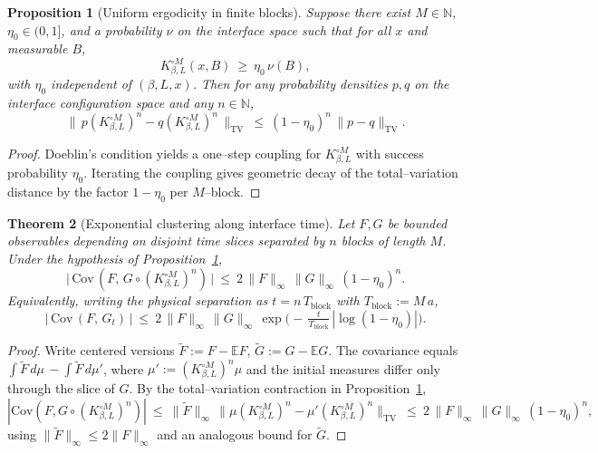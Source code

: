 \documentclass[11pt]{amsart}
\theoremstyle{plain}
\newtheorem{theorem}{Theorem}[section]
\newtheorem{proposition}[theorem]{Proposition}
\theoremstyle{definition}
\theoremstyle{remark}
\begin{document}
\begin{proposition}[Uniform ergodicity in finite blocks]\label{prop:uniform-ergodicity-blocks}
Suppose there exist $M\in\mathbb N$, $\eta_0\in(0,1]$, and a probability $\nu$ on the interface space such that for all $x$ and measurable $B$,
\[
  K_{\beta,L}^{\circ M}(x,B)\ \ge\ \eta_0\, \nu(B),
\]
with $\eta_0$ independent of $(\beta,L,x)$. Then for any probability densities $p,q$ on the interface configuration space and any $n\in\mathbb N$,
\[
  \big\|\, p (K_{\beta,L}^{\circ M})^{n} - q (K_{\beta,L}^{\circ M})^{n} \,\big\|_{\mathrm{TV}}
   \ \le\ (1-\eta_0)^{n}\, \|p-q\|_{\mathrm{TV}}.
\]
\end{proposition}
\begin{proof}
Doeblin's condition yields a one--step coupling for $K_{\beta,L}^{\circ M}$ with success probability $\eta_0$. Iterating the coupling gives geometric decay of the total--variation distance by the factor $1-\eta_0$ per $M$--block.
\end{proof}

\begin{theorem}[Exponential clustering along interface time]\label{thm:exp-cluster-interface}
Let $F,G$ be bounded observables depending on disjoint time slices separated by $n$ blocks of length $M$. Under the hypothesis of Proposition~\ref{prop:uniform-ergodicity-blocks},
\[
  \big|\, \mathrm{Cov}\,(F,\, G\circ (K_{\beta,L}^{\circ M})^{n})\,\big|\ \le\ 2\,\|F\|_\infty\,\|G\|_\infty\,(1-\eta_0)^{n}.
\]
Equivalently, writing the physical separation as $t=n\,T_{\mathrm{block}}$ with $T_{\mathrm{block}}:=M\,a$,
\[
  \big|\, \mathrm{Cov}\,(F,\, G_t)\,\big|\ \le\ 2\,\|F\|_\infty\,\|G\|_\infty\, \exp\!\Big(-\, \tfrac{t}{T_{\mathrm{block}}}\, |\log(1-\eta_0)|\Big).
\]
\end{theorem}
\begin{proof}
Write centered versions $\widetilde F:=F-\mathbb E F$, $\widetilde G:=G-\mathbb E G$. The covariance equals $\int \widetilde F\, d\mu\, - \int \widetilde F\, d\mu'$, where $\mu' := (K_{\beta,L}^{\circ M})^{n}\mu$ and the initial measures differ only through the slice of $G$. By the total--variation contraction in Proposition~\ref{prop:uniform-ergodicity-blocks},
\[
  |\mathrm{Cov}(F, G\circ (K_{\beta,L}^{\circ M})^{n})| \ \le\ \|\widetilde F\|_\infty\, \big\|\mu (K_{\beta,L}^{\circ M})^{n} - \mu' (K_{\beta,L}^{\circ M})^{n}\big\|_{\mathrm{TV}}
   \ \le\ 2\,\|F\|_\infty\,\|G\|_\infty\,(1-\eta_0)^{n},
\]
using $\|\widetilde F\|_\infty\le 2\|F\|_\infty$ and an analogous bound for $\widetilde G$.
\end{proof}
\end{document}
